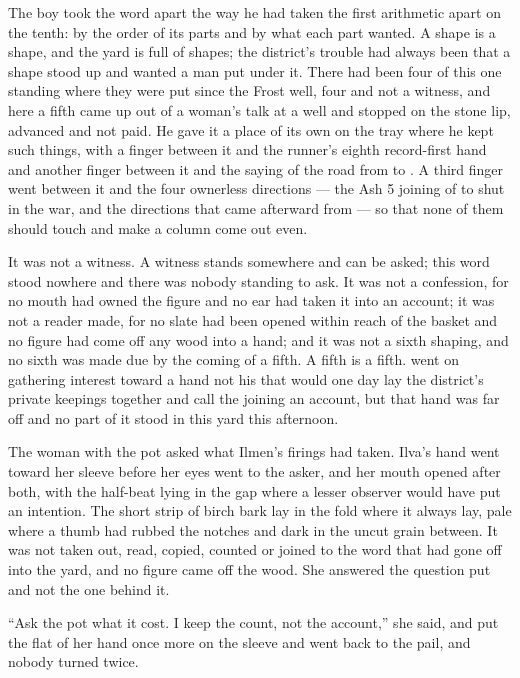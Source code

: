 The boy took the word apart the way he had taken the first arithmetic apart on the tenth: by the order of its parts and by what each part wanted. A shape is a shape, and the yard is full of shapes; the district's trouble had always been that a shape stood up and wanted a man put under it. There had been four of this one standing where they were put since the Frost well, four and not a witness, and here a fifth came up out of a woman's talk at a well and stopped on the stone lip, advanced and not paid. He gave it a place of its own on the tray where he kept such things, with a finger between it and the runner's eighth record-first hand and another finger between it and the saying of the road from  to . A third finger went between it and the four ownerless directions --- the Ash 5 joining of  to  shut in the war, and the directions that came afterward from  --- so that none of them should touch and make a column come out even.

It was not a witness. A witness stands somewhere and can be asked; this word stood nowhere and there was nobody standing to ask. It was not a confession, for no mouth had owned the figure and no ear had taken it into an account; it was not a reader made, for no slate had been opened within reach of the basket and no figure had come off any wood into a hand; and it was not a sixth shaping, and no sixth was made due by the coming of a fifth. A fifth is a fifth.  went on gathering interest toward a hand not his that would one day lay the district's private keepings together and call the joining an account, but that hand was far off and no part of it stood in this yard this afternoon.

The woman with the pot asked what Ilmen's firings had taken. Ilva's hand went toward her sleeve before her eyes went to the asker, and her mouth opened after both, with the half-beat lying in the gap where a lesser observer would have put an intention. The short strip of birch bark lay in the fold where it always lay, pale where a thumb had rubbed the notches and dark in the uncut grain between. It was not taken out, read, copied, counted or joined to the word that had gone off into the yard, and no figure came off the wood. She answered the question put and not the one behind it.

“Ask the pot what it cost. I keep the count, not the account,” she said, and put the flat of her hand once more on the sleeve and went back to the pail, and nobody turned twice.

